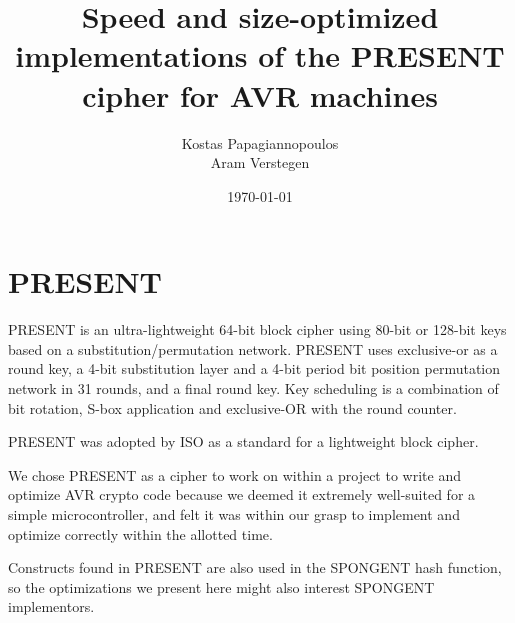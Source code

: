 \documentclass{llncs}
\begin{document}
\title{Speed and size-optimized implementations of the PRESENT cipher for AVR machines}
\author{
Kostas Papagiannopoulos \\
Aram Verstegen
}
\date{\today}

\maketitle


\section{PRESENT}
PRESENT \cite{bogdanov2007present} is an ultra-lightweight 64-bit block cipher using 80-bit or 128-bit keys based on a substitution/permutation network.
PRESENT uses exclusive-or as a round key, a 4-bit substitution layer and a 4-bit period bit position permutation network in 31 rounds, and a final round key.
Key scheduling is a combination of bit rotation, S-box application and exclusive-OR with the round counter.

PRESENT was adopted by ISO as a standard for a lightweight block cipher. \cite{present_iso}

We chose PRESENT as a cipher to work on within a project to write and optimize AVR crypto code because we deemed it extremely well-suited for a simple microcontroller, and felt it was within our grasp to implement and optimize correctly within the allotted time.

Constructs found in PRESENT are also used in the SPONGENT \cite{bogdanov2011spongent} hash function, so the optimizations we present here might also interest SPONGENT implementors.

\end{document}
